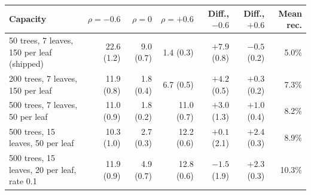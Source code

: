 \begin{tabular}{lrrrrrr}
\toprule
Capacity & $\rho=-0.6$ & $\rho=0$ & $\rho=+0.6$ & Diff., $-0.6$ & Diff., $+0.6$ & Mean rec. \\
\midrule
50 trees, 7 leaves, 150 per leaf (shipped) & 22.6 (1.2) & 9.0 (0.7) & 1.4 (0.3) & $+7.9$ (0.8) & $-0.5$ (0.2) & 5.0\% \\
200 trees, 7 leaves, 150 per leaf & 11.9 (0.8) & 1.8 (0.4) & 6.7 (0.5) & $+4.2$ (0.5) & $+0.3$ (0.2) & 7.3\% \\
500 trees, 7 leaves, 50 per leaf & 11.0 (0.9) & 1.8 (0.2) & 11.0 (0.7) & $+3.0$ (1.3) & $+1.0$ (0.4) & 8.2\% \\
500 trees, 15 leaves, 50 per leaf & 10.3 (1.0) & 2.7 (0.3) & 12.2 (0.6) & $+0.1$ (2.1) & $+2.4$ (0.3) & 8.9\% \\
500 trees, 15 leaves, 20 per leaf, rate 0.1 & 11.9 (0.9) & 4.9 (0.7) & 12.8 (0.6) & $-1.5$ (1.9) & $+2.3$ (0.3) & 10.3\% \\
\bottomrule
\end{tabular}
